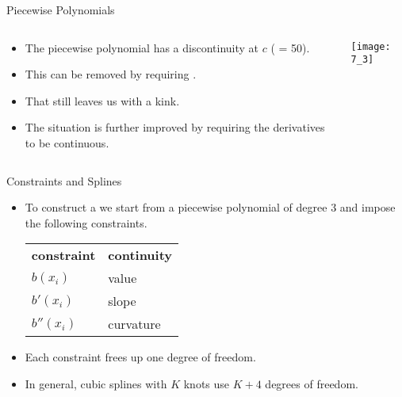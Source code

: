 \documentclass[mathserif, aspectratio=169]{beamer}
\begin{document}
\begin{frame}{Piecewise Polynomials}
	\begin{columns}
		\begin{column}{0.5\textwidth}
			\begin{itemize}
				\item The piecewise polynomial has a discontinuity at $c$ ( = 50).
				\item This can be removed by requiring .
				\item That still leaves us with a kink.
				\item The situation is further improved by requiring 
					the derivatives to be continuous.
			\end{itemize}
		\end{column}
		\begin{column}{0.5\textwidth}
			\begin{center}
				\texttt{[image: 7\_3]}
			\end{center}
		\end{column}
	\end{columns}
\end{frame}

\begin{frame}{Constraints and Splines}
	\begin{itemize}
		\item To construct a  we start from a piecewise polynomial
			of degree 3 and impose the following constraints.
			\begin{popblock}{0.4\textwidth}{}
				\begin{tabular}[h]{ll}
					{\bfseries\blue constraint} & {\bfseries\blue continuity} \\
					$b(x_i)$ & value \\
					$b'(x_i)$ & slope \\
					$b''(x_i)$ & curvature\\
				\end{tabular}
			\end{popblock}
		\item Each constraint frees up one degree of freedom.
		\item In general, cubic splines with $K$ knots use $K+4$ degrees of freedom.
	\end{itemize}
\end{frame}
\end{document}
